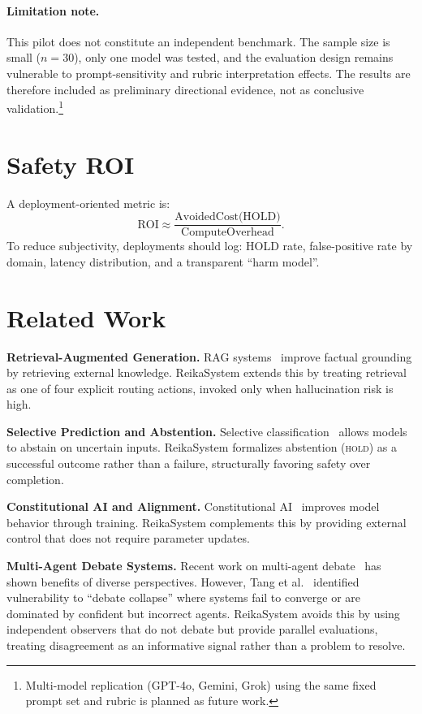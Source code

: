 \documentclass[11pt,a4paper]{article}
\begin{document}
\paragraph{Limitation note.}
This pilot does not constitute an independent benchmark.
The sample size is small ($n=30$), only one model was tested, and the evaluation design
remains vulnerable to prompt-sensitivity and rubric interpretation effects.
The results are therefore included as preliminary directional evidence,
not as conclusive validation.\footnote{
  Multi-model replication (GPT-4o, Gemini, Grok) using the same fixed prompt set
  and rubric is planned as future work.
}

\section{Safety ROI}

A deployment-oriented metric is:
\begin{equation}
\text{ROI} \approx \frac{\text{AvoidedCost(HOLD)}}{\text{ComputeOverhead}}.
\end{equation}
To reduce subjectivity, deployments should log: HOLD rate, false-positive rate by domain,
latency distribution, and a transparent ``harm model''.

\section{Related Work}

\textbf{Retrieval-Augmented Generation.} RAG systems~\cite{lewis2020rag} improve factual
grounding by retrieving external knowledge. ReikaSystem extends this by treating retrieval as
one of four explicit routing actions, invoked only when hallucination risk is high.

\textbf{Selective Prediction and Abstention.} Selective classification~\cite{geifman2017selective}
allows models to abstain on uncertain inputs. ReikaSystem formalizes abstention (\textsc{hold})
as a successful outcome rather than a failure, structurally favoring safety over completion.

\textbf{Constitutional AI and Alignment.} Constitutional AI~\cite{bai2022constitutional}
improves model behavior through training. ReikaSystem complements this by providing external
control that does not require parameter updates.

\textbf{Multi-Agent Debate Systems.} Recent work on multi-agent
debate~\cite{du2023improving} has shown benefits of diverse perspectives. However,
Tang et al.~\cite{tang2024variance} identified vulnerability to ``debate collapse'' where
systems fail to converge or are dominated by confident but incorrect agents. ReikaSystem
avoids this by using independent observers that do not debate but provide parallel
evaluations, treating disagreement as an informative signal rather than a problem to resolve.
\end{document}

